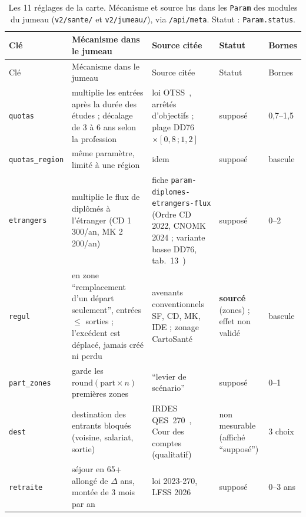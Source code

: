 \begin{small}
\begin{longtable}{@{}p{}p{}p{}p{}p{}@{}}
\caption{Les 11 réglages de la carte. Mécanisme et source lus dans les \texttt{Param} des modules du jumeau (\texttt{v2/\allowbreak{}sante/\allowbreak{}} et \texttt{v2/\allowbreak{}jumeau/\allowbreak{}}), via \texttt{/\allowbreak{}api/\allowbreak{}meta}. Statut : \texttt{Param.status}.}\label{pro:tab-leviers}\\
\toprule Clé & Mécanisme dans le jumeau & Source citée & Statut & Bornes \\ \midrule\endfirsthead
\toprule Clé & Mécanisme dans le jumeau & Source citée & Statut & Bornes \\ \midrule\endhead
\bottomrule\endfoot
\texttt{quotas} & multiplie les entrées après la durée des études ; décalage de 3 à 6\suppose{} ans selon la profession & loi OTSS~\citep{e-loiotss2019}, arrêtés d'objectifs ; plage DD76 $\times[0{,}8\,;1{,}2]$\suppose{}~\citep{e-dd76} & supposé & 0,7--1,5\mesure{} \\
\texttt{quotas\_\allowbreak{}region} & même paramètre, limité à une région & idem & supposé & bascule \\
\texttt{etrangers} & multiplie le flux de diplômés à l'étranger (CD 1\,300\derive{}/an, MK 2\,200\derive{}/an) & fiche \texttt{param-\allowbreak{}diplomes-\allowbreak{}etrangers-\allowbreak{}flux} (Ordre CD 2022, CNOMK 2024 ; variante basse DD76, tab.~13~\citep{e-dd76}) & supposé & 0--2\mesure{} \\
\texttt{regul} & en zone \enquote{remplacement d'un départ seulement}, entrées $\leq$ sorties ; l'excédent est déplacé, jamais créé ni perdu & avenants conventionnels SF, CD, MK, IDE ; zonage CartoSanté~\citep{e-cartosante2026} & \textbf{sourcé} (zones) ; effet non validé & bascule \\
\texttt{part\_\allowbreak{}zones} & garde les $\mathrm{round}(\text{part}\times n)$ premières zones & \enquote{levier de scénario} & supposé & 0--1\mesure{} \\
\texttt{dest} & destination des entrants bloqués (voisine, salariat, sortie) & IRDES QES~270~\citep{e-irdes270}, Cour des comptes~\citep{e-ccomptes2024} (qualitatif) & non mesurable (affiché \enquote{supposé}) & 3\mesure{} choix \\
\texttt{retraite} & séjour en 65+ allongé de $\Delta$ ans, montée de 3\mesure{} mois par an & loi 2023-270, LFSS 2026 & supposé & 0--3\mesure{} ans \\

\end{longtable}
\end{small}
